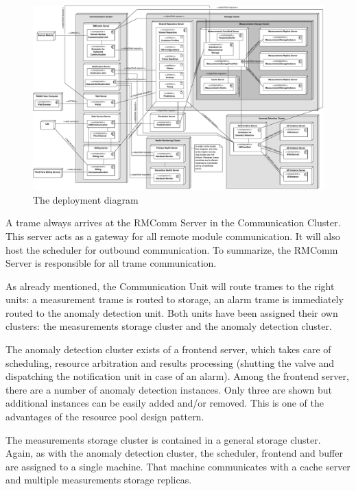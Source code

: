 \begin{figure}
	\begin{centering}
		\includegraphics[width=1.42\textwidth,angle=90]{figs/final-deployment.pdf}
		\caption{The deployment diagram}
		\label{fig:final-deployment}
	\end{centering}
\end{figure}

\npar A trame always arrives at the RMComm Server in the Communication Cluster.
This server acts as a gateway for all remote module communication. It will also
host the scheduler for outbound communication. To summarize, the RMComm Server
is responsible for all trame communication. 

\npar As already mentioned, the Communication Unit will route trames to the
right units: a measurement trame is routed to storage, an alarm trame is
immediately routed to the anomaly detection unit. Both units have been assigned
their own clusters: the measurements storage cluster and the anomaly detection
cluster. 

\npar The anomaly detection cluster exists of a frontend server, which takes
care of scheduling, resource arbitration and results processing
(shutting the valve and dispatching the notification unit in case of an alarm).
Among the frontend server, there are a number of anomaly detection instances.
Only three are shown but additional instances can be easily added and/or
removed. This is one of the advantages of the resource pool design pattern.

\npar The measurements storage cluster is contained in a general storage
cluster. Again, as with the anomaly detection cluster, the scheduler, frontend
and buffer are assigned to a single machine. That machine communicates with a
cache server and multiple measurements storage replicas. 

